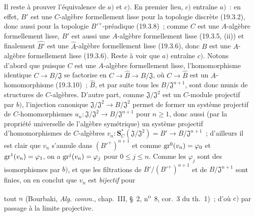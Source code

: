 \begin{env}[19.5.4.4]
\label{0.19.5.4.4-fr}
Il reste à prouver l'équivalence de $a)$ et $c)$. En premier lieu, $c)$ entraîne
$a)$~: en effet, $B'$ est une $C$-algèbre formellement lisse pour la topologie
discrète (19.3.2), donc aussi pour la topologie ${B'}^+$-préadique (19.3.8)~;
comme $C$ est une $A$-algèbre formellement lisse, $B'$ est aussi une
$A$-algèbre formellement lisse (19.3.5, (ii)) et finalement $\widehat{B'}$ est
une $\widehat A$-algèbre formellement lisse (19.3.6), donc $B$ est une
$A$-algèbre formellement lisse (19.3.6). Reste à voir que $a)$ entraîne $c)$.
Notons d'abord que puisque $C$ est une $A$-algèbre formellement lisse,
l'homomorphisme identique $C\to B/\mathfrak J$ se factorise en
$C\to\widehat B\to B/\mathfrak J$, où $C\to\widehat B$ est un
$A$-homomorphisme (19.3.10)~; $\widehat B$, et par suite tous les
$B/\mathfrak J^{n+1}$, sont donc munis de structures de $C$-algèbres. D'autre
part, comme $\mathfrak J/\mathfrak J^2$ est un $C$-module projectif par $b)$,
l'injection canonique $\mathfrak J/\mathfrak J^2\to B/\mathfrak J^2$ permet de
former un système projectif de $C$-homomorphismes
$u_n:\mathfrak J/\mathfrak J^2\to B/\mathfrak J^{n+1}$ pour $n\geq1$, donc
aussi (par la propriété universelle de l'algèbre symétrique) un système
projectif d'homomorphismes de $C$-algèbres
$v_n:\mathbf S_C^*(\mathfrak J/\mathfrak J^2)=B'\to B/\mathfrak J^{n+1}$~;
d'ailleurs il est clair que $v_n$ s'annule dans $({B'}^+)^{n+1}$ et comme
$\operatorname{gr}^0(v_n)=\varphi_0$ et $\operatorname{gr}^1(v_n)=\varphi_1$, on a
$\operatorname{gr}^j(v_n)=\varphi_j$ pour $0\leq j\leq n$. Comme les $\varphi_j$ sont des
isomorphismes par $b)$, et que les filtrations de
$B'/({B'}^+)^{n+1}$ et de $B/\mathfrak J^{n+1}$ sont finies, on en conclut que
$v_n$ est \emph{bijectif} pour


tout $n$ (Bourbaki, \emph{Alg. comm.}, chap.~III, §~2,
n\textsuperscript{o}~8, cor.~3 du th.~1)~; d'où $c)$ par passage à la limite
projective.
\end{env}

